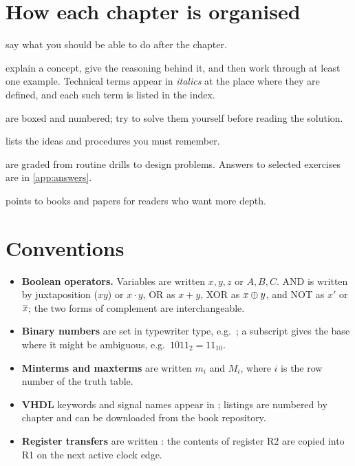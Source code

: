 \section*{How each chapter is organised}
\begin{description}[font=\sffamily\bfseries, leftmargin=1.4em, labelindent=0pt]
  \item[Learning objectives] say what you should be able to do after the chapter.
  \item[Sections] explain a concept, give the reasoning behind it, and then work through at least one example. Technical terms appear in \textit{italics} at the place where they are defined, and each such term is listed in the index.
  \item[Worked examples] are boxed and numbered; try to solve them yourself before reading the solution.
  \item[Chapter summary] lists the ideas and procedures you must remember.
  \item[Exercises] are graded from routine drills to design problems. Answers to selected exercises are in \cref{app:answers}.
  \item[Further reading] points to books and papers for readers who want more depth.
\end{description}

\section*{Conventions}
\begin{itemize}
  \item \textbf{Boolean operators.} Variables are written $x, y, z$ or $A, B, C$. AND is written by juxtaposition ($xy$) or $x\cdot y$,
        OR as $x+y$, XOR as $x\oplus y$, and NOT as $x'$ or $\overline{x}$; the two forms of complement are interchangeable.
  \item \textbf{Binary numbers} are set in typewriter type, e.g.\ ; a subscript gives the base where it might be ambiguous, e.g.\ $1011_2 = 11_{10}$.
  \item \textbf{Minterms and maxterms} are written $m_i$ and $M_i$, where $i$ is the row number of the truth table.
  \item \textbf{VHDL} keywords and signal names appear in ; listings are numbered by chapter and can be downloaded from the book repository.
  \item \textbf{Register transfers} are written : the contents of register R2 are copied into R1 on the next active clock edge.
\end{itemize}


